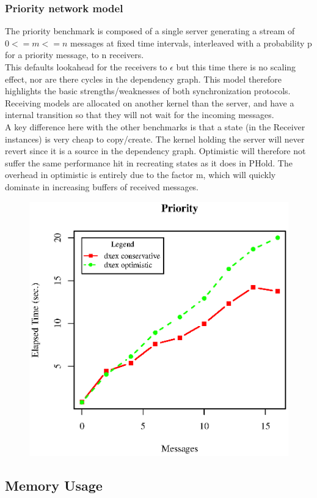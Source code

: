 \subsubsection{Priority network model}
The priority benchmark is composed of a single server generating a stream of $0<=m<=n$ messages at fixed time intervals, interleaved with a probability p for a priority message, to n receivers. \\ This defaults lookahead for the receivers to $\epsilon$ but this time there is no scaling effect, nor are there cycles in the dependency graph. This model therefore highlights the basic strengths/weaknesses of both synchronization protocols. Receiving models are allocated on another kernel than the server, and have a internal transition so that they will not wait for the incoming messages. 
 \\
A key difference here with the other benchmarks is that a state (in the Receiver instances) is very cheap to copy/create. The kernel holding the server will never revert since it is a source in the dependency graph. Optimistic will therefore not suffer the same performance hit in recreating states as it does in PHold. The overhead in optimistic is entirely due to the factor m, which will quickly dominate in increasing buffers of received messages.
\begin{figure}[ltbh]
	\includegraphics[width=.5\textwidth]{fig/fig5.eps}
	\label{fig5.eps}
\end{figure} 

\subsection{Memory Usage}
